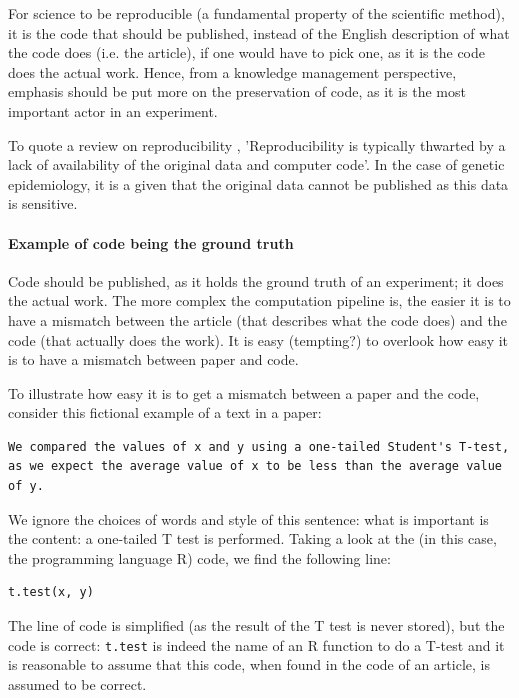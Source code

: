 For science to be reproducible (a fundamental property of the scientific 
method), it is the code that should be published, instead of the
English description of what the code does (i.e. the article), if one
would have to pick one, as it is the code does the actual work.
Hence, from a knowledge management perspective, emphasis should be
put more on the preservation of code, as it is the most important actor
in an experiment.

To quote a review on reproducibility \cite{peng2021reproducible}, 
'Reproducibility is typically thwarted by a 
lack of availability of the original data and computer code'.
In the case of genetic epidemiology, it is a given that the original
data cannot be published as this data is sensitive.

\paragraph{Example of code being the ground truth}

Code should be published, as it holds the
ground truth of an experiment; it does the actual work.
The more complex the computation pipeline is, the easier it is
to have a mismatch between the article (that describes what the
code does) and the code (that actually does the work).
It is easy (tempting?) to overlook how easy it is to have a mismatch
between paper and code.

To illustrate how easy it is to get a mismatch between a paper
and the code, consider this fictional example
of a text in a paper:

\begin{verbatim}
We compared the values of x and y using a one-tailed Student's T-test,
as we expect the average value of x to be less than the average value of y.
\end{verbatim}

We ignore the choices of words and style of this sentence: what is
important is the content: a one-tailed T test is performed.
Taking a look at the (in this case, the programming language R) code, 
we find the following line:

\begin{verbatim}
t.test(x, y)
\end{verbatim}

The line of code is simplified (as the result of the T test is never stored),
but the code is correct:
\verb|t.test| is indeed the name of an R function to do a T-test
and it is reasonable to assume that this code, when found in the code
of an article, is assumed to be correct.

